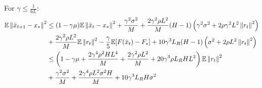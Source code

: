 \begin{lemma}\label{lem:very_main}
    For $\gamma \leq \frac{1}{6L}$:
    \begin{align}
        \begin{split}
            \mathbb{E} \left\|\bar{x}_{t+1}-x_*\right\|^2
            &\leq
            (1 - \gamma \mu) \mathbb{E} \left\|\bar{x}_t - x_*\right\|^2 
            + \frac{\gamma^2 \sigma^2}{M} + \frac{2 \gamma^2 \rho L^2}{M}  (H-1) \left(\gamma^2 \sigma^2 + 2 \rho \gamma^2 L^2 \left\|r_t\right\|^2 \right)  \\
            &+ \frac{2 \gamma^2 \rho L^2}{M} \mathbb{E} \left\|r_t\right\|^2
            - \frac{\gamma}{5} \mathbb{E} [F(\bar{x}_t) - F_*] 
            + 10 \gamma^3 L_R (H-1) \left(\sigma^2 + 2 \rho L^2 \left\|r_t\right\|^2 \right) \\
            &\leq
            \left(1 - \gamma \mu 
            + \frac{2\gamma^4 \rho^2 H L^4}{M} 
            + \frac{2\gamma^2 \rho L^2}{M}
            + 20 \gamma^3 \rho L_R H L^2 \right) \mathbb{E} \left\|r_t\right\|^2 \\
            &+ \frac{\gamma^2 \sigma^2}{M} + \frac{2\gamma^4 \rho L^2 \sigma^2 H}{M}
            + 10 \gamma^3 L_R H \sigma^2
        \end{split}
    \end{align}
\end{lemma}
